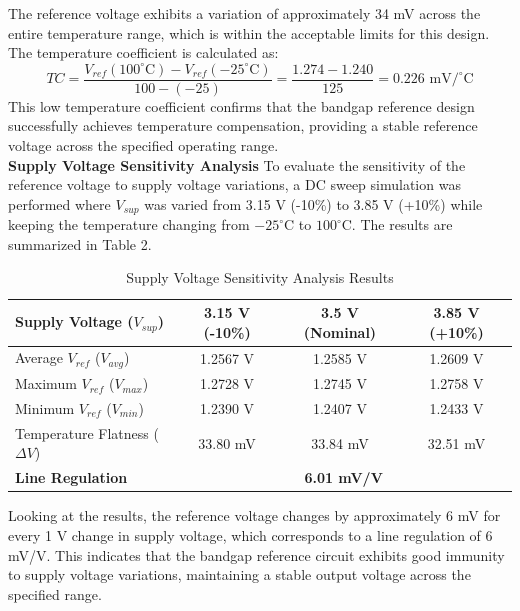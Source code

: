 \documentclass[12pt]{article}
\begin{document}
The reference voltage exhibits a variation of approximately 34 mV across the entire temperature range, which is within the acceptable limits for this design. The temperature coefficient is calculated as:
\begin{equation*}
TC = \frac{V_{ref}(100^\circ\text{C}) - V_{ref}(-25^\circ\text{C})}{100 - (-25)} = \frac{1.274 - 1.240}{125} = 0.226 \text{ mV/}^\circ\text{C}
\end{equation*}
This low temperature coefficient confirms that the bandgap reference design successfully achieves temperature compensation, providing a stable reference voltage across the specified operating range.\\
\newline
\noindent
\textbf{Supply Voltage Sensitivity Analysis}
To evaluate the sensitivity of the reference voltage to supply voltage variations, a DC sweep simulation was performed where $V_{sup}$ was varied from 3.15 V (-10\%) to 3.85 V (+10\%) while keeping the temperature changing from $-25^\circ\text{C}$ to $100^\circ\text{C}$. The results are summarized in Table 2.
\begin{table}[h]
\centering
\label{tab:bgr_results}
\begin{tabular}{@{}lccc@{}}
\toprule
\textbf{Supply Voltage ($V_{sup}$)} & \textbf{3.15 V (-10\%)} & \textbf{3.5 V (Nominal)} & \textbf{3.85 V (+10\%)} \\ \midrule
Average $V_{ref}$ ($V_{avg}$)       & 1.2567 V                & 1.2585 V                 & 1.2609 V                \\
Maximum $V_{ref}$ ($V_{max}$)       & 1.2728 V                & 1.2745 V                 & 1.2758 V                \\
Minimum $V_{ref}$ ($V_{min}$)       & 1.2390 V                & 1.2407 V                 & 1.2433 V                \\
Temperature Flatness ($\Delta V$)   & 33.80 mV                & 33.84 mV                 & 32.51 mV                \\ \midrule
\textbf{Line Regulation}            & \multicolumn{3}{c}{\textbf{6.01 mV/V}}                                     \\ \bottomrule
\end{tabular}
\caption{Supply Voltage Sensitivity Analysis Results}
\end{table}

Looking at the results, the reference voltage changes by approximately 6 mV for every 1 V change in supply voltage, which corresponds to a line regulation of 6 mV/V. This indicates that the bandgap reference circuit exhibits good immunity to supply voltage variations, maintaining a stable output voltage across the specified range.
\end{document}
